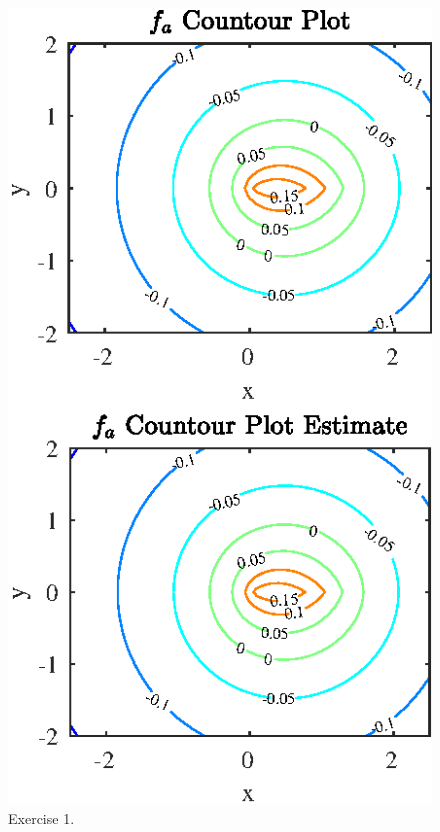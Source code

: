 


  

\begin{figure}[htbp]
\centering
\includegraphics[scale=1.55]{graphs/e2g1.eps}
\caption{Exercise 1.}
\label{Exercise 2}
\end{figure}

